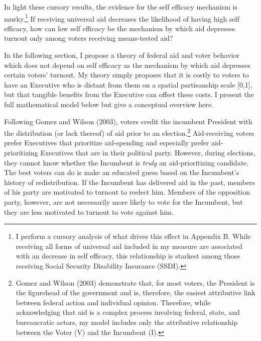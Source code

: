 \documentclass[12pt]{paper}
\begin{document}
In light these cursory results, the evidence for the self efficacy mechanism is murky.\footnote{I perform a cursory analysis of what drives this effect in Appendix B. While receiving all forms of universal aid included in my measure are associated with an decrease in self efficacy, this relationship is starkest among those receiving Social Security Disability Insurance (SSDI).} If receiving universal aid decreases the likelihood of having high self efficacy, how can low self efficacy be the mechanism by which aid depresses turnout only among voters receiving means-tested aid?

In the following section, I propose a theory of federal aid and voter behavior which does not depend on self efficacy as the mechanism by which aid depresses certain voters' turnout. My theory simply proposes that it is costly to voters to have an Executive who is distant from them on a spatial partisanship scale [0,1], but that tangible benefits from the Executive can offset these costs. I present the full mathematical model below but give a conceptual overview here. 

Following Gomez and Wilson (2003), voters credit the incumbent President with the distribution (or lack thereof) of aid prior to an election.\footnote{Gomez and Wilson (2003) demonstrate that, for most voters, the President is the figurehead of the government and is, therefore, the easiest attributive link between federal action and individual opinion. Therefore, while acknowledging that aid is a complex process involving federal, state, and bureaucratic actors, my model includes only the attributive relationship between the Voter (V) and the Incumbent (I).} Aid-receiving voters prefer Executives that prioritize aid-spending and especially prefer aid-prioritizing Executives that are in their political party. However, during elections, they cannot know whether the Incumbent is \textit{truly} an aid-prioritizing candidate. The best voters can do is make an educated guess based on the Incumbent's history of redistribution. If the Incumbent has delivered aid in the past, members of his party are motivated to turnout to reelect him. Members of the opposition party, however, are not necessarily more likely to vote for the Incumbent, but they are less motivated to turnout to vote against him.
\end{document}
